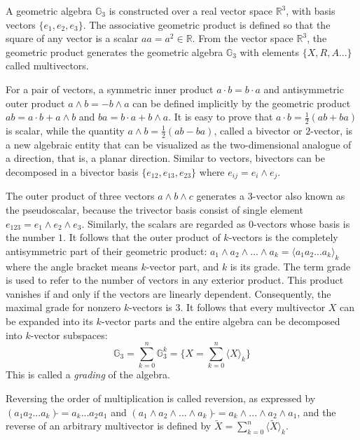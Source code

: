 \documentclass{birkjour}
\numberwithin{equation}{section}
\begin{document}
A geometric algebra $\mathbb{G}_3$ is constructed over a real vector space $\mathbb R^3$, with basis vectors $\{e_1, e_2, e_3\}$. The associative geometric product is defined so that the square of any vector is a scalar $a a = a^2 \in \mathbb{R}$. From the vector space $\mathbb R^3$, the geometric product generates the geometric algebra $\mathbb{G}_3$ with elements $\{ X, R, A...\}$ called multivectors.

For a pair of vectors, a symmetric inner product $a \cdot b = b \cdot a$ and antisymmetric outer product $a \wedge b = -b \wedge a$ can be defined implicitly by the geometric product $a b = a \cdot b + a \wedge b$ and $b a = b \cdot a + b \wedge a$. It is easy to prove that $a \cdot b = \frac{1}{2}(a b + b a)$ is scalar, while the quantity $a \wedge b = \frac{1}{2}(a b - b a)$, called a bivector or $2$-vector, is a new algebraic entity that can be visualized as the two-dimensional analogue of a direction, that is, a planar direction. Similar to vectors, bivectors can be decomposed in a bivector basis $\{ e_{12}, e_{13}, e_{23} \}$ where $e_{ij} = e_i \wedge e_j$.

The outer product of three vectors $a \wedge b \wedge c$ generates a $3$-vector also known as the pseudoscalar, because the trivector basis consist of single element $e_{123} = e_1 \wedge e_2 \wedge e_3$. Similarly, the scalars are regarded as $0$-vectors whose basis is the number $1$. It follows that the outer product of $k$-vectors is the completely antisymmetric part of their geometric product: $a_1 \wedge a_2 \wedge ... \wedge a_k = \langle a_1 a_2 ... a_k \rangle_k$ where the angle bracket means $k$-vector part, and $k$ is its grade. The term grade is used to refer to the number of vectors in any exterior product. This product vanishes if and only if the vectors are linearly dependent. Consequently, the maximal grade for nonzero $k$-vectors is $3$. It follows that every multivector $X$ can be expanded into its $k$-vector parts and the entire algebra can be decomposed into $k$-vector subspaces:
\begin{equation*}
\mathbb G_3 = \sum_{k=0}^n{\mathbb{G}^k_3} = \{ X = \sum_{k=0}^n { \langle X \rangle_k } \}
\end{equation*}
This is called a \emph{grading} of the algebra. 

Reversing the order of multiplication is called reversion, as expressed by $(a_1 a_2 ... a_k)\tilde{} = a_k ... a_2 a_1$ and $(a_1 \wedge a_2 \wedge ... \wedge a_k)\tilde{} = a_k \wedge ... \wedge a_2 \wedge a_1$, and the reverse of an arbitrary multivector is defined by $\tilde{X} = \sum_{k=0}^n { \langle \tilde{X} \rangle_k }$.
\end{document}
